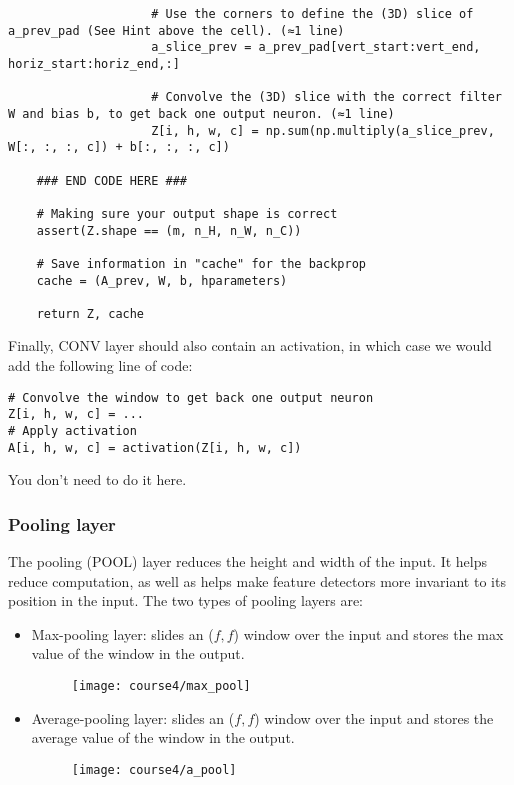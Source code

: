 {\begin{verbatim}
                    # Use the corners to define the (3D) slice of a_prev_pad (See Hint above the cell). (≈1 line)
                    a_slice_prev = a_prev_pad[vert_start:vert_end, horiz_start:horiz_end,:]
                    
                    # Convolve the (3D) slice with the correct filter W and bias b, to get back one output neuron. (≈1 line)
                    Z[i, h, w, c] = np.sum(np.multiply(a_slice_prev, W[:, :, :, c]) + b[:, :, :, c])
                                        
    ### END CODE HERE ###
    
    # Making sure your output shape is correct
    assert(Z.shape == (m, n_H, n_W, n_C))
    
    # Save information in "cache" for the backprop
    cache = (A_prev, W, b, hparameters)
    
    return Z, cache
\end{verbatim}


Finally, CONV layer should also contain an activation, in which case we would add the following line of code:

\begin{verbatim}
# Convolve the window to get back one output neuron
Z[i, h, w, c] = ...
# Apply activation
A[i, h, w, c] = activation(Z[i, h, w, c])
\end{verbatim}
You don't need to do it here.


\subsubsection{Pooling layer}

The pooling (POOL) layer reduces the height and width of the input. It helps reduce computation, as well as helps make feature detectors more invariant to its position in the input. The two types of pooling layers are:
\begin{itemize}
\item Max-pooling layer: slides an ($f, f$) window over the input and stores the max value of the window in the output.
\begin{figure}[h]
\begin{center}
\texttt{[image: course4/max\_pool]}
\end{center}
\end{figure}

\item Average-pooling layer: slides an ($f, f$) window over the input and stores the average value of the window in the output.
\begin{figure}[h]
\begin{center}
\texttt{[image: course4/a\_pool]}
\end{center}
\end{figure}


\end{itemize}}
